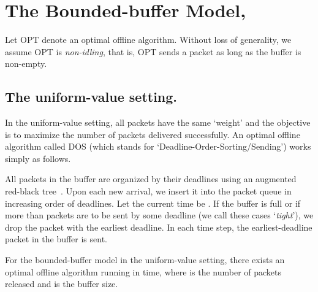\documentclass[final, 11pt]{article}
\begin{document}
\section{The Bounded-buffer Model, }

Let OPT denote an optimal offline algorithm. Without loss of generality, we assume OPT is {\em non-idling}, that is, OPT sends a packet as long as the buffer is non-empty.


\subsection{The uniform-value setting.}

In the uniform-value setting, all packets have the same `weight' and the objective is to maximize the number of packets delivered successfully. An optimal offline algorithm called DOS (which stands for `Deadline-Order-Sorting/Sending') works simply as follows.

\begin{algorithm}
All packets in the buffer are organized by their deadlines using an augmented red-black tree~\cite{CLRS01}. Upon each new arrival, we insert it into the packet queue in increasing order of deadlines. Let the current time be . If the buffer is full or if more than  packets are to be sent by some deadline  (we call these cases `{\em tight}'), we drop the packet with the earliest deadline. In each time step, the earliest-deadline packet in the buffer is sent.
\end{algorithm}

\begin{Lemma}
For the bounded-buffer model in the uniform-value setting, there exists an optimal offline algorithm running in  time, where  is the number of packets released and  is the buffer size.
\label{lemma:singleoff1}
\end{Lemma}
\end{document}
